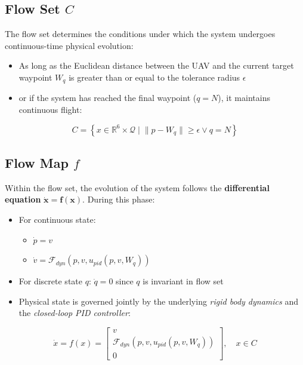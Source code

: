 \documentclass{article}
\begin{document}
\subsection{Flow Set $C$}

The flow set determines the conditions under which the system undergoes continuous-time physical evolution:
\begin{itemize}
  \item As long as the Euclidean distance between the UAV and the current target waypoint $W_q$ is greater than or equal to the tolerance radius $\epsilon$
  \item or if the system has reached the final waypoint ($q=N$), it maintains continuous flight:
\end{itemize}

\begin{equation}
  C = \left\lbrace x \in \mathbb{R}^6 \times \mathcal{Q} \mid \lVert p - W_q \rVert \ge \epsilon \lor q = N \right\rbrace
\end{equation}

\subsection{Flow Map $f$}

Within the flow set, the evolution of the system follows the \textbf{differential equation} $\bm{\dot{x}=f(x)}$. During this phase:

\begin{itemize}
  \item For continuous state:
  \begin{itemize}
    \item $\dot{p} = v$
    \item $\dot{v} = \mathcal{F}_{dyn}(p,v,u_{pid}(p,v,W_q))$
  \end{itemize}
  \item For discrete state $q$: $\dot{q}=0$ since $q$ is invariant in flow set
  \item Physical state is governed jointly by the underlying \textit{rigid body dynamics} and the \textit{closed-loop PID controller}:
\end{itemize}

\begin{equation}
\dot{x} = f(x) = \begin{bmatrix} 
v \\
\mathcal{F}_{dyn}(p, v, u_{pid}(p, v, W_q)) \\ 
0 
\end{bmatrix}, \quad x \in C
\end{equation}
\end{document}
